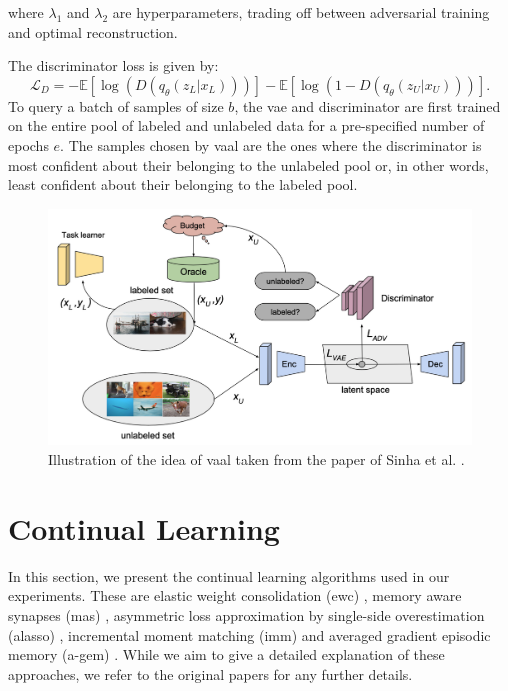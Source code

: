 where $\lambda_1$ and $\lambda_2$ are hyperparameters, trading off between adversarial training and optimal reconstruction. \par
The discriminator loss is given by:
\begin{equation}
    \mathcal{L}_D = - \mathbb{E}[\log(D(q_\theta (z_L | x_L)))] - \mathbb{E}[\log (1- D(q_\theta (z_U | x_U)))].
\end{equation}
To query a batch of samples of size $b$, the \gls{vae} and discriminator are first trained on the entire pool of labeled and unlabeled data for a
pre-specified number of epochs $e$. The samples chosen by \gls{vaal} are the ones where the discriminator is most confident about their belonging to the unlabeled
pool or, in other words, least confident about their belonging to the labeled pool.
\begin{figure} [ht]
    \centering
    \includegraphics[width=.8\linewidth]{images/Vaal_idea.png}
    \caption[Visualization of \gls{vaal}]{Illustration of the idea of \gls{vaal} taken from the paper of Sinha et al. \cite{sinha2019variational}.}
    \label{fig:VAAL}
\end{figure}


\section{Continual Learning}
\label{sec:Related_work:Continual_Learning}
In this section, we present the continual learning algorithms used in our experiments. These are elastic weight
consolidation (\gls{ewc}) \cite{kirkpatrick2017overcoming}, memory aware synapses (\gls{mas}) \cite{aljundi2018memory}, asymmetric loss approximation by single-side overestimation
(\gls{alasso}) \cite{park2019continual}, incremental moment matching (\gls{imm}) \cite{lee2017overcoming} and averaged gradient episodic memory (\gls{a-gem}) \cite{lopez2017gradient}.
While we aim to give a detailed explanation of these approaches, we refer to the original papers for any further details. \par

